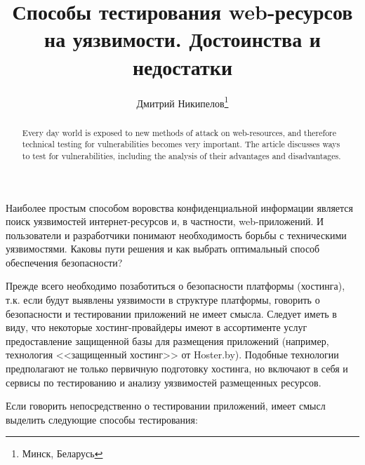 \documentclass[10pt, a5paper]{article}
\begin{document}
\title{Способы тестирования web-ресурсов на уязвимости. Достоинства и недостатки}%

\author{Дмитрий  Никипелов\footnote{Минск, Беларусь}}
\maketitle

\begin{abstract}
Every day world is exposed to new methods of attack on web-resources, and therefore technical testing for vulnerabilities becomes very important. The article discusses ways to test for vulnerabilities, including the analysis of their advantages and disadvantages.
\end{abstract}

Наиболее простым способом воровства конфиденциальной информации является поиск уязвимостей интернет-ресурсов и, в частности, web-приложений. И пользователи и разработчики понимают необходимость борьбы с техническими уязвимостями. Каковы пути решения и как выбрать оптимальный способ обеспечения безопасности?

Прежде всего необходимо позаботиться о безопасности платформы (хостинга), т.к. если будут выявлены уязвимости в структуре платформы, говорить о безопасности и тестировании приложений не имеет смысла. Следует иметь в виду, что некоторые хостинг-провайдеры имеют в ассортименте услуг предоставление защищенной базы для размещения приложений (например, технология <<защищенный хостинг>> от Hoster.by). Подобные технологии предполагают не только первичную подготовку хостинга, но включают в себя и сервисы по тестированию и анализу уязвимостей размещенных ресурсов.

Если говорить непосредственно о тестировании приложений, имеет смысл выделить следующие способы тестирования:
\end{document}
